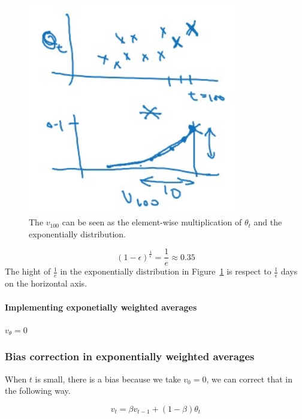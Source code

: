 \documentclass[UTF8]{article}
\begin{document}
\begin{figure}[htb]
    \centering
    \includegraphics[width=25em]{figures/exp-weighted-average}
    \caption{The $v_{100}$ can be seen as the element-wise multiplication of $\theta_t$ and the
    exponentially distribution.}
    \label{fig:exp-weighted-average}
\end{figure}

$$ (1 - \epsilon)^{\frac{1}{\epsilon}} = \frac{1}{e} \approx 0.35 $$
The hight of $\displaystyle \frac{1}{e}$ in the exponentially distribution in
Figure~\ref{fig:exp-weighted-average} is respect to $\displaystyle \frac{1}{\epsilon}$ days on the
horizontal axis.

\paragraph{Implementing exponetially weighted averages}
\begin{algorithm}[htb]
    $v_{\theta} = 0$ \\
\end{algorithm}

\subsubsection{Bias correction in exponentially weighted averages}
When $t$ is small, there is a bias because we take $v_0 = 0$, we can correct that in the following
way.

$$ v_t = \beta v_{t-1} + (1-\beta)\theta_t $$
\end{document}
